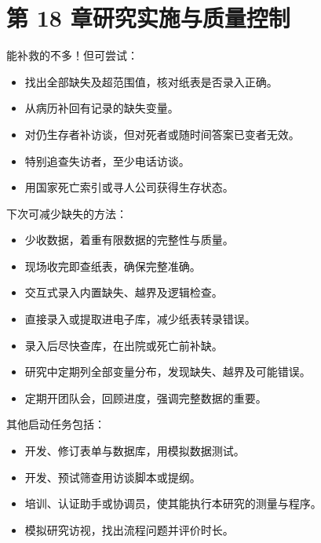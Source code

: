 \section{第 18 章\quad 研究实施与质量控制}
\begin{answerlist}
\item[1a.] 能补救的不多！但可尝试：
\begin{itemize}
\item 找出全部缺失及超范围值，核对纸表是否录入正确。
\item 从病历补回有记录的缺失变量。
\item 对仍生存者补访谈，但对死者或随时间答案已变者无效。
\item 特别追查失访者，至少电话访谈。
\item 用国家死亡索引或寻人公司获得生存状态。
\end{itemize}
\item[1b.] 下次可减少缺失的方法：
\begin{itemize}
\item 少收数据，着重有限数据的完整性与质量。
\item 现场收完即查纸表，确保完整准确。
\item 交互式录入内置缺失、越界及逻辑检查。
\item 直接录入或提取进电子库，减少纸表转录错误。
\item 录入后尽快查库，在出院或死亡前补缺。
\item 研究中定期列全部变量分布，发现缺失、越界及可能错误。
\item 定期开团队会，回顾进度，强调完整数据的重要。
\end{itemize}
\item[2.] 其他启动任务包括：
\begin{itemize}
\item 开发、修订表单与数据库，用模拟数据测试。
\item 开发、预试筛查用访谈脚本或提纲。
\item 培训、认证助手或协调员，使其能执行本研究的测量与程序。
\item 模拟研究访视，找出流程问题并评价时长。
\end{itemize}
\end{answerlist}

